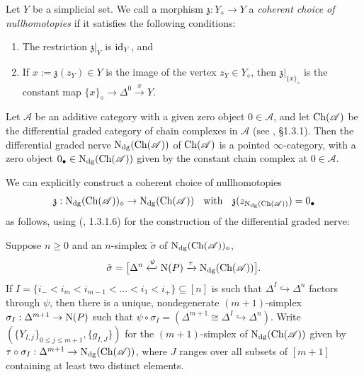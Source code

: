 \documentclass{tac}
\newcommand{\f}[1]{\mathfrak{#1}}
\newcommand{\s}[1]{\mathscr{#1}}
\newcommand{\tx}[1]{\textnormal{#1}}
\begin{document}
\begin{definition}\label{cohnulldefn} Let $Y$ be a simplicial set.  We call a morphism $\f{z} : Y_\diamond \to Y$ a \emph{coherent choice of nullhomotopies} if it satisfies the following conditions:
\begin{enumerate}
\item The restriction $\f{z} |_{Y}$ is $\tx{id}_Y$, and
\item If $x := \f{z}(z_Y) \in Y$ is the image of the vertex $z_Y \in Y_\diamond$, then $\f{z}|_{\{ x\}_\diamond }$ is the constant map $\{ x\}_\diamond \to \Delta^0 \xrightarrow{x} Y$.
\end{enumerate}\end{definition}
\begin{rmk}\label{dgnervermk} Let $\s{A}$ be an additive category with a given zero object $0\in \s{A}$, and let $\tx{Ch}(\s{A})$ be the differential graded category of chain complexes in $\s{A}$ (see \cite{ha}, \S 1.3.1).  Then the differential graded nerve $\tx{N}_{\tx{dg}} (\tx{Ch}(\s{A}) )$ of $\tx{Ch}(\s{A})$ is a pointed $\infty$-category, with a zero object $0_\bullet \in \tx{N}_{\tx{dg}} (\tx{Ch}(\s{A}) )$ given by the constant chain complex at $0 \in \s{A}$.

We can explicitly construct a coherent choice of nullhomotopies 
\[\f{z} : \tx{N}_{\tx{dg}} (\tx{Ch}(\s{A}) )_\diamond  \to \tx{N}_{\tx{dg}} (\tx{Ch}(\s{A}) ) \tx{ \; with \; }\f{z}(z_{ \tx{N}_{\tx{dg}}(\tx{Ch}(\s{A}) )}) = 0_\bullet \]
as follows, using (\cite{ha}, 1.3.1.6) for the construction of the differential graded nerve:

\hfill

Suppose $n\geq 0$ and an $n$-simplex $\tilde{\sigma}$ of $\tx{N}_{\tx{dg}} (\tx{Ch}(\s{A}) )_\diamond$,
\[ \tilde{\sigma} = \big[ \Delta^n \xhookleftarrow{\psi} \tx{N}(P) \xrightarrow{\tau} \tx{N}_{\tx{dg}} (\tx{Ch}(\s{A}) )  \big].  \]
If $I = \{ i_- < i_m < i_{m-1} < \dots < i_1 < i_+ \} \subseteq [n]$ is such that $\Delta^I \hookrightarrow \Delta^n$ factors through $\psi$, then there is a unique, nondegenerate $(m+1)$-simplex $\sigma_I : \Delta^{m+1}\to \tx{N}(P)$ such that $\psi \circ \sigma_I = (\Delta^{m+1} \cong \Delta^I \hookrightarrow \Delta^n)$.  Write $( \{Y_{I, j} \}_{0\leq j \leq m+1} , \{ g_{I,J} \})$ for the $(m+1)$-simplex of $\tx{N}_{\tx{dg}} (\tx{Ch}(\s{A}))$ given by $\tau \circ \sigma_I : \Delta^{m+1} \to \tx{N}_{\tx{dg}} (\tx{Ch}(\s{A}))$, where $J$ ranges over all subsets of $[m+1]$ containing at least two distinct elements.  


\end{rmk}
\end{document}
